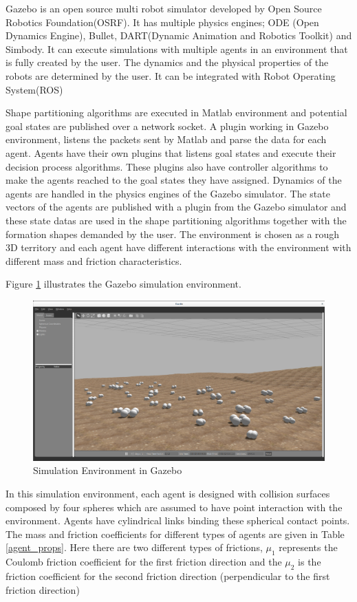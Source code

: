 Gazebo is an open source multi robot simulator developed by Open Source Robotics Foundation(OSRF). It has multiple physics engines; ODE (Open Dynamics Engine), Bullet, DART(Dynamic Animation and Robotics Toolkit) and Simbody. It can execute simulations with multiple agents in an environment that is fully created by the user. The dynamics and the physical properties of the robots are determined by the user. It can be integrated with Robot Operating System(ROS)

Shape partitioning algorithms are executed in Matlab environment and  potential goal states are published over a network socket. A plugin working in Gazebo environment, listens the packets sent by Matlab and parse the data for each agent. Agents have their own plugins that listens goal states and execute their decision process algorithms. These plugins also have controller algorithms to make the agents reached to the goal states they have assigned. Dynamics of the agents are handled in the physics engines of the Gazebo simulator. The state vectors of the agents are published with a plugin from the Gazebo simulator and these state datas are used in the shape partitioning algorithms together with the formation shapes demanded by the user.   The environment is chosen as a rough 3D territory and each agent have different interactions with the environment with different mass and friction characteristics.

Figure \ref{Gazebo} illustrates the Gazebo simulation environment. 

\begin{figure}[H]
\caption{Simulation Environment in Gazebo} \label{Gazebo}
\centerline{\includegraphics[scale = 0.22]{gazebo_env}}
\end{figure} 

In this simulation environment, each agent is designed with collision surfaces composed by four spheres which are assumed to have point interaction with the environment. Agents have 
cylindrical links binding these spherical contact points. The mass and friction coefficients for different types of agents are given in Table \ref{agent_props}. Here there are two different types of frictions, $\mu_1$ represents the Coulomb friction coefficient for the first friction direction and the $\mu_2$ is the friction coefficient for the second friction direction (perpendicular to the first friction direction)

